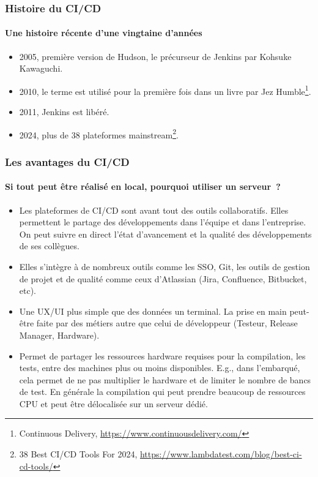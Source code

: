 \documentclass{beamer}
\begin{document}
    \begin{frame}
        \frametitle{Histoire du CI/CD}
        \framesubtitle{Une histoire récente d'une vingtaine d'années}
        \transdissolve
        \begin{itemize}
            \item 2005, première version de Hudson, le précurseur de Jenkins par Kohsuke Kawaguchi.
            \item 2010, le terme  est utilisé pour la première fois dans un livre par Jez Humble\footnote{\label{ci}Continuous Delivery, \url{https://www.continuousdelivery.com/}}.
            \item 2011, Jenkins est libéré.
            \item 2024, plus de 38 plateformes mainstream\footnote{38 Best CI/CD Tools For 2024, \url{https://www.lambdatest.com/blog/best-ci-cd-tools/}}.
        \end{itemize}
    \end{frame}

    \begin{frame}
        \frametitle{Les avantages du CI/CD}
        \framesubtitle{Si tout peut être réalisé en local, pourquoi utiliser un serveur~?}
        \transdissolve
        \begin{itemize}
            \item Les plateformes de CI/CD sont avant tout des outils collaboratifs.
            Elles permettent le partage des développements dans l'équipe et dans l'entreprise.
            On peut suivre en direct l'état d'avancement et la qualité des développements de ses collègues.
            \item Elles s'intègre à de nombreux outils comme les SSO, Git, les outils de gestion de projet et de qualité comme ceux d'Atlassian (Jira, Confluence, Bitbucket, etc).
            \item Une UX/UI plus simple que des données un terminal.
            La prise en main peut-être faite par des métiers autre que celui de développeur (Testeur, Release Manager, Hardware).
            \item Permet de partager les ressources hardware requises pour la compilation, les tests, entre des machines plus ou moins disponibles.
            E.g., dans l'embarqué, cela permet de ne pas multiplier le hardware et de limiter le nombre de bancs de test.
            En générale la compilation qui peut prendre beaucoup de ressources CPU et peut être délocalisée sur un serveur dédié.
        \end{itemize}
    \end{frame}
\end{document}
